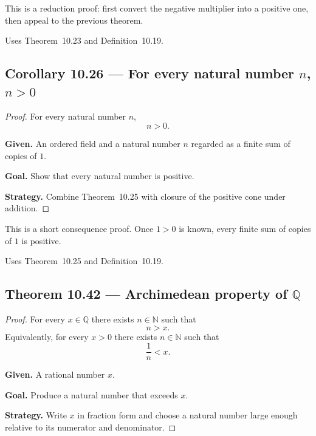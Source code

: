 \begin{remark*}
This is a reduction proof: first convert the negative multiplier into a
positive one, then appeal to the previous theorem.
\end{remark*}

\begin{remark*}[Dependencies]
Uses Theorem~10.23 and Definition~10.19.
\end{remark*}


\subsection*{Corollary 10.26 — For every natural number $n$, $n>0$}
\label{prf:grep-natural-numbers-positive}

\begin{proof}
\Claim For every natural number $n$,
\[
n > 0.
\]

\textbf{Given.} An ordered field and a natural number $n$ regarded as a finite sum of copies of $1$.

\textbf{Goal.} Show that every natural number is positive.

\textbf{Strategy.} Combine Theorem~10.25 with closure of the positive cone under addition.


\end{proof}

\begin{remark*}
This is a short consequence proof.  Once $1>0$ is known, every finite sum of
copies of $1$ is positive.
\end{remark*}

\begin{remark*}[Dependencies]
Uses Theorem~10.25 and Definition~10.19.
\end{remark*}


\subsection*{Theorem 10.42 — Archimedean property of $\mathbb{Q}$}
\label{prf:grep-archimedean-q}

\begin{proof}
\Claim For every $x \in \mathbb{Q}$ there exists $n \in \mathbb{N}$ such that
\[
n > x.
\]
Equivalently, for every $x>0$ there exists $n \in \mathbb{N}$ such that
\[
\frac{1}{n} < x.
\]

\textbf{Given.} A rational number $x$.

\textbf{Goal.} Produce a natural number that exceeds $x$.

\textbf{Strategy.} Write $x$ in fraction form and choose a natural number large enough relative to its numerator and denominator.


\end{proof}

